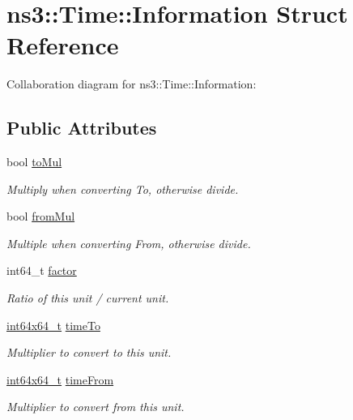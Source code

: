 \hypertarget{structns3_1_1Time_1_1Information}{}\section{ns3\+:\+:Time\+:\+:Information Struct Reference}
\label{structns3_1_1Time_1_1Information}


Collaboration diagram for ns3\+:\+:Time\+:\+:Information\+:
\subsection*{Public Attributes}
\begin{DoxyCompactItemize}
\item 
bool \hyperlink{structns3_1_1Time_1_1Information_a397ae841edfe126ecc26ffd5fed21742}{to\+Mul}
\begin{DoxyCompactList}\small\item\em Multiply when converting To, otherwise divide. \end{DoxyCompactList}\item 
bool \hyperlink{structns3_1_1Time_1_1Information_a9627bc334dac20619a1ef17a7b2d6f85}{from\+Mul}
\begin{DoxyCompactList}\small\item\em Multiple when converting From, otherwise divide. \end{DoxyCompactList}\item 
int64\+\_\+t \hyperlink{structns3_1_1Time_1_1Information_a0919ab79c4545807c083ff3b2a382c81}{factor}
\begin{DoxyCompactList}\small\item\em Ratio of this unit / current unit. \end{DoxyCompactList}\item 
\hyperlink{classint64x64__t}{int64x64\+\_\+t} \hyperlink{structns3_1_1Time_1_1Information_af79a720070ce8c87ed09c5313ad7e41b}{time\+To}
\begin{DoxyCompactList}\small\item\em Multiplier to convert to this unit. \end{DoxyCompactList}\item 
\hyperlink{classint64x64__t}{int64x64\+\_\+t} \hyperlink{structns3_1_1Time_1_1Information_a3d78392b5f36cdef34b72c7ea14988e9}{time\+From}
\begin{DoxyCompactList}\small\item\em Multiplier to convert from this unit. \end{DoxyCompactList}\end{DoxyCompactItemize}


